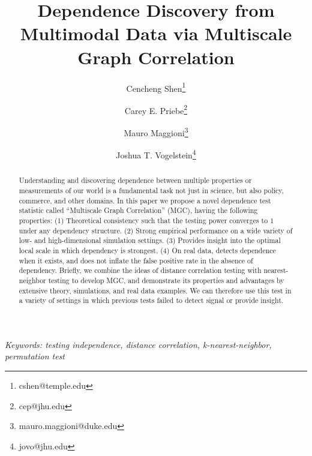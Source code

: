 \documentclass[11pt]{article}
\begin{document}
\def\spacingset#1{\renewcommand{\baselinestretch}%
{#1}\small\normalsize} \spacingset{1}

\title{\bf Dependence Discovery from Multimodal Data via  Multiscale Graph Correlation}
\author[1]{Cencheng Shen\thanks{cshen@temple.edu}}
\author[2]{Carey E. Priebe\thanks{cep@jhu.edu}}
\author[3]{Mauro Maggioni\thanks{mauro.maggioni@duke.edu}}
\author[4]{Joshua T. Vogelstein\thanks{jovo@jhu.edu}}
\maketitle
\pagestyle{empty}

\bigskip
\begin{abstract}
Understanding and discovering dependence between multiple properties or measurements of our world is a fundamental task not just in science, but also policy, commerce, and other domains. 
In this paper we propose a novel dependence test statistic called ``Multiscale Graph Correlation'' (MGC), having the following properties: (1) Theoretical consistency such that the testing power converges to $1$ under any dependency structure. 
(2) Strong empirical performance on a wide variety of low- and high-dimensional simulation settings. (3) Provides insight into the optimal local scale in which dependency is strongest. (4) On real data, detects dependence when it exists, and does not inflate the false positive rate in the absence of dependency. 
Briefly, we combine the ideas of distance correlation testing with nearest-neighbor testing to develop MGC, and demonstrate its properties and advantages by extensive theory, simulations, and real data examples. We can therefore use this test in a variety of settings in which previous tests failed to detect signal or provide insight.
\end{abstract}

\noindent%
{\it Keywords: testing independence, distance correlation, k-nearest-neighbor, permutation test}
\vfill
\end{document}
